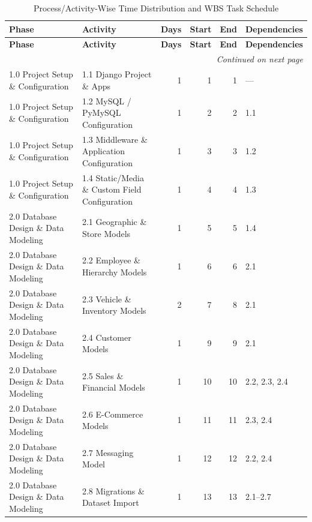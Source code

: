 \pagebreak
\renewcommand{\arraystretch}{1.25}
\setlength{\tabcolsep}{5pt}
\scriptsize

\begin{longtable}{@{}p{3cm}p{5.5cm}rrrp{1.8cm}@{}}
\caption{Process/Activity-Wise Time Distribution and WBS Task Schedule}
\label{tab:time-distribution}\\

\toprule
\textbf{Phase} & \textbf{Activity} &
\textbf{Days} & \textbf{Start} & \textbf{End} & \textbf{Dependencies} \\
\midrule
\endfirsthead

\toprule
\textbf{Phase} & \textbf{Activity} &
\textbf{Days} & \textbf{Start} & \textbf{End} & \textbf{Dependencies} \\
\midrule
\endhead

\midrule
\multicolumn{6}{r}{\textit{Continued on next page}} \\
\endfoot

\bottomrule
\endlastfoot

1.0 Project Setup \& Configuration
& 1.1 Django Project \& Apps & 1 & 1 & 1 & --- \\
1.0 Project Setup \& Configuration
& 1.2 MySQL / PyMySQL Configuration & 1 & 2 & 2 & 1.1 \\
1.0 Project Setup \& Configuration
& 1.3 Middleware \& Application Configuration & 1 & 3 & 3 & 1.2 \\
1.0 Project Setup \& Configuration
& 1.4 Static/Media \& Custom Field Configuration & 1 & 4 & 4 & 1.3 \\

2.0 Database Design \& Data Modeling
& 2.1 Geographic \& Store Models & 1 & 5 & 5 & 1.4 \\
2.0 Database Design \& Data Modeling
& 2.2 Employee \& Hierarchy Models & 1 & 6 & 6 & 2.1 \\
2.0 Database Design \& Data Modeling
& 2.3 Vehicle \& Inventory Models & 2 & 7 & 8 & 2.1 \\
2.0 Database Design \& Data Modeling
& 2.4 Customer Models & 1 & 9 & 9 & 2.1 \\
2.0 Database Design \& Data Modeling
& 2.5 Sales \& Financial Models & 1 & 10 & 10 & 2.2, 2.3, 2.4 \\
2.0 Database Design \& Data Modeling
& 2.6 E-Commerce Models & 1 & 11 & 11 & 2.3, 2.4 \\
2.0 Database Design \& Data Modeling
& 2.7 Messaging Model & 1 & 12 & 12 & 2.2, 2.4 \\
2.0 Database Design \& Data Modeling
& 2.8 Migrations \& Dataset Import & 1 & 13 & 13 & 2.1--2.7 \\


\end{longtable}
